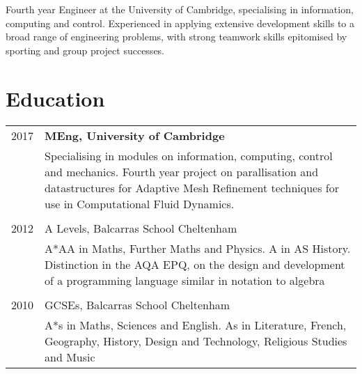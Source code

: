 \documentclass[10pt,a4paper]{article}
\def \rowdiv {\multicolumn{2}{c}{} \\}
\newcommand{\sbicon}[1]{\textcolor{myblue}{\csname #1\endcsname}}
\begin{document}
\pagestyle{empty}






    \noindent Fourth year Engineer at the University of Cambridge, specialising in information, computing and control. Experienced in applying extensive development skills to a broad range of engineering problems, with strong teamwork skills epitomised by sporting and group project successes.


\section{Education}
    \begin{tabular}{R{2cm}|p{12cm}}
        2017        & \textbf{MEng, University of Cambridge} \\
                    & \footnotesize{Specialising in modules on information, computing, control and mechanics. Fourth year project on parallisation and datastructures for Adaptive Mesh Refinement techniques for use in Computational Fluid Dynamics. } \\ \rowdiv
        2012        & A Levels, Balcarras School Cheltenham \\
                    & \footnotesize{A*AA in Maths, Further Maths and Physics. A in AS History. Distinction in the AQA EPQ, on the design and development of a programming language similar in notation to algebra} \\ \rowdiv
        2010        & GCSEs, Balcarras School Cheltenham \\
                    & \footnotesize{A*s in Maths, Sciences and English. As in Literature, French, Geography, History, Design and Technology, Religious Studies and Music} \\
    \end{tabular}
\end{document}
